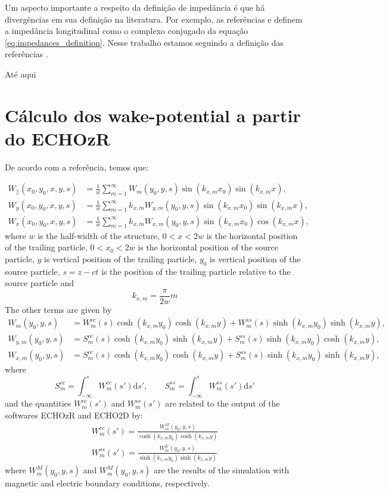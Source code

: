 Um aspecto importante a respeito da definição de impedância é que há divergências em sua definição na literatura. Por exemplo, as referências \cite{Zotter1993} e \cite{Wilson1987} definem a impedância longitudinal como o complexo conjugado da equação \eqref{eq:impedances_definition}. Nesse trabalho estamos seguindo a definição das referências \cite{CHao1993,Stupakov2000a,Heifets1991}.

{\huge Até aqui}

\section{Cálculo dos wake-potential a partir do ECHOzR}

De acordo com a referência, temos que:

\begin{align}
W_{||}(x_0,y_0,x,y,s) &= \frac1w\sum_{m=1}^\infty W_m(y_0,y,s)\sin(k_{x,m}x_0)\sin(k_{x,m}x), \\
W_y(x_0,y_0,x,y,s) &= \frac1w\sum_{m=1}^\infty k_{x,m}W_{y,m}(y_0,y,s)\sin(k_{x,m}x_0)\sin(k_{x,m}x), \\
W_x(x_0,y_0,x,y,s) &= \frac1w\sum_{m=1}^\infty k_{x,m}W_{x,m}(y_0,y,s)\sin(k_{x,m}x_0)\cos(k_{x,m}x),
\end{align}
where $w$ is the half-width of the structure, $0<x<2w$ is the horizontal position of the trailing particle, $0<x_0<2w$ is the horizontal position of the source particle, $y$ is vertical position of the trailing particle, $y_0$ is vertical position of the source particle, $s=z-ct$ is the position of the trailing particle relative to the source particle and
\begin{equation}
k_{x,m} = \frac{\pi}{2w}m
\end{equation}
The other terms are given by
\begin{align}
W_m(y_0,y,s)     &= W^{cc}_m(s)\cosh(k_{x,m}y_0)\cosh(k_{x,m}y) + W^{ss}_m(s)\sinh(k_{x,m}y_0)\sinh(k_{x,m}y), \\
W_{y,m}(y_0,y,s) &= S^{cc}_m(s)\cosh(k_{x,m}y_0)\sinh(k_{x,m}y) + S^{ss}_m(s)\sinh(k_{x,m}y_0)\cosh(k_{x,m}y), \\
W_{x,m}(y_0,y,s) &= S^{cc}_m(s)\cosh(k_{x,m}y_0)\cosh(k_{x,m}y) + S^{ss}_m(s)\sinh(k_{x,m}y_0)\sinh(k_{x,m}y),
\end{align}
where
\begin{equation}
S^{cc}_m = \int_{-\infty}^s W^{cc}_m(s')\mathrm{d}s', \qquad S^{ss}_m = \int_{-\infty}^s W^{ss}_m(s')\mathrm{d}s'
\end{equation}
and the quantities $W^{cc}_m(s')$ and $W^{ss}_m(s')$ are related to the output of the softwares ECHOzR and ECHO2D by:
\begin{align}
W^{cc}_m(s') = \frac{W_m^M(y_0,y,s)}{\cosh(k_{x,m}y_0)\cosh(k_{x,m}y)} \\
W^{ss}_m(s') = \frac{W_m^E(y_0,y,s)}{\sinh(k_{x,m}y_0)\sinh(k_{x,m}y)}
\end{align}
where $W_m^M(y_0,y,s)$ and $W_m^M(y_0,y,s)$ are the results of the simulation with magnetic and electric boundary conditions, respectively.


